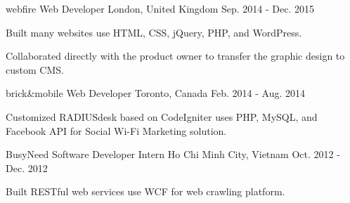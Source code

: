 \begin{cventries}

\cventry
{webfire}
{Web Developer}
{London, United Kingdom}
{Sep. 2014 - Dec. 2015}
{
\begin{cvitems}
\item {Built many websites use HTML, CSS, jQuery, PHP, and WordPress.}
\item {Collaborated directly with the product owner to transfer the graphic design to custom CMS.}
\end{cvitems} 
}


\cventry
{brick\&mobile}
{Web Developer}
{Toronto, Canada}
{Feb. 2014 - Aug. 2014}
{
\begin{cvitems}
\item {Customized RADIUSdesk based on CodeIgniter uses PHP, MySQL, and Facebook API for Social Wi-Fi Marketing solution.}
\end{cvitems}
}


\cventry
{BusyNeed}
{Software Developer Intern}
{Ho Chi Minh City, Vietnam}
{Oct. 2012 - Dec. 2012}
{
\begin{cvitems}
\item {Built RESTful web services use WCF for web crawling platform.}
\end{cvitems}
}


\end{cventries}
